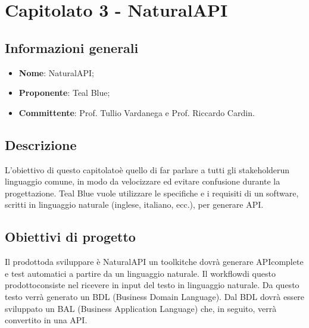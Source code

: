 \section{Capitolato 3 - NaturalAPI}
\subsection{Informazioni generali}
\begin{itemize}
	\item \textbf{Nome}: NaturalAPI;
	\item \textbf{Proponente}: Teal Blue;
	\item \textbf{Committente}: Prof. Tullio Vardanega e Prof. Riccardo Cardin.
\end{itemize}
\subsection{Descrizione}
L'obiettivo di questo capitolato\glosp è quello di far parlare a tutti gli stakeholder\glosp un linguaggio comune, in modo da velocizzare ed evitare confusione durante la progettazione\glo. Teal Blue vuole utilizzare le specifiche e i requisiti di un software, scritti in linguaggio naturale (inglese, italiano, ecc.), per generare API\glo.

\subsection{Obiettivi di progetto}
Il prodotto\glosp da sviluppare è NaturalAPI un toolkit\glosp che dovrà generare API\glosp complete e test automatici a partire da un linguaggio naturale. Il workflow\glosp di questo prodotto\glosp consiste nel ricevere in input del testo in linguaggio naturale. Da questo testo verrà generato un BDL (Business Domain Language). Dal BDL dovrà essere sviluppato un BAL (Business Application Language) che, in seguito, verrà convertito in una API\glo.


